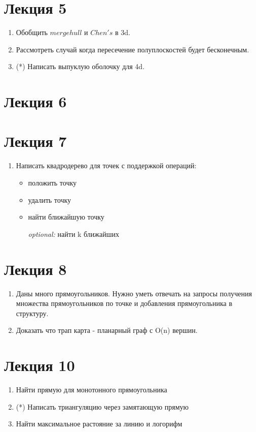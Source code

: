 \documentclass[12pt,a4paper,oneside]{article}
\begin{document}
\section*{Лекция 5}
	\begin{enumerate}
		\item Обобщить $mergehull$ и $Chen's$ в 3d.
		\item Рассмотреть случай когда пересечение полуплоскостей будет бесконечным.
		\item (*) Написать выпуклую оболочку для 4d.
	\end{enumerate}

\section*{Лекция 6}

\section*{Лекция 7}
	\begin{enumerate}
		\item Написать квадродерево для точек с поддержкой операций: 
		\begin{itemize}
			\item положить точку
			\item удалить точку
			\item найти ближайшую точку
			\item[\it optional:] найти k ближайших
		\end{itemize}
	\end{enumerate}

\section*{Лекция 8}
   \begin{enumerate}
      \item Даны много прямоугольников. Нужно уметь отвечать на запросы получения множества прямоугольников по точке и добавления прямоугольника в структуру.
      \item Доказать что трап карта - планарный граф с O(n) вершин.
   \end{enumerate}
\section*{Лекция 10}
   \begin{enumerate}
      \item Найти прямую для монотонного прямоугольника
      \item (*) Написать триангуляцию через замятающую прямую
      \item Найти максимальное растояние за линию и логорифм
   \end{enumerate}
\end{document}
